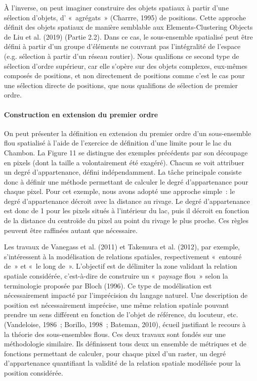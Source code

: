 À l’inverse, on peut imaginer construire des objets spatiaux à partir
d’une sélection d’objets, d’ « agrégats » (Charrre, 1995) de
positions. Cette approche définit des objets spatiaux de manière
semblable aux Elements-Clustering Objects de Liu et al. (2019) (Partie
2.2). Dans ce cas, le sous-ensemble spatialisé peut être défini à
partir d’un groupe d’éléments ne couvrant pas l’intégralité de
l’espace (e.g. sélection à partir d’un réseau routier). Nous
qualifions ce second type de sélection d’ordre supérieur, car elle
s’opère sur des objets complexes, eux-mêmes composés de positions, et
non directement de positions comme c’est le cas pour une sélection
directe de positions, que nous qualifions de sélection de premier
ordre.

\paragraph{Construction en extension du premier ordre}

On peut présenter la définition en extension du premier ordre d’un
sous-ensemble flou spatialisé à l’aide de l’exercice de définition
d’une limite pour le lac du Chambon. La Figure 11 se distingue des
exemples précédents par son découpage en pixels (dont la taille a
volontairement été exagéré). Chacun se voit attribuer un degré
d’appartenance, défini indépendamment. La tâche principale consiste
donc à définir une méthode permettant de calculer le degré
d’appartenance pour chaque pixel. Pour cet exemple, nous avons adopté
une approche simple : le degré d’appartenance décroit avec la distance
au rivage. Le degré d’appartenance est donc de 1 pour les pixels
situés à l’intérieur du lac, puis il décroit en fonction de la
distance du centroïde du pixel au point du rivage le plus proche. Ces
règles peuvent être raffinées autant que nécessaire.

Les travaux de Vanegass et al. (2011) et Takemura et al. (2012), par
exemple, s’intéressent à la modélisation de relations spatiales,
respectivement « entouré de » et « le long de ». L’objectif est de
délimiter la zone validant la relation spatiale considérée,
c’est-à-dire de construire un « paysage flou » selon la terminologie
proposée par Bloch (1996). Ce type de modélisation est nécessairement
impacté par l’imprécision du langage naturel. Une description de
position est nécessairement imprécise, une même relation spatiale
pouvant prendre un sens différent en fonction de l’objet de référence,
du locuteur, etc. (Vandeloise, 1986 ; Borillo, 1998 ; Bateman, 2010),
écueil justifiant le recours à la théorie des sous-ensembles
flous. Ces deux travaux sont fondés sur une méthodologie
similaire. Ils définissent tous deux un ensemble de métriques et de
fonctions permettant de calculer, pour chaque pixel d’un raster, un
degré d’appartenance quantifiant la validité de la relation spatiale
modélisée pour la position considérée.

